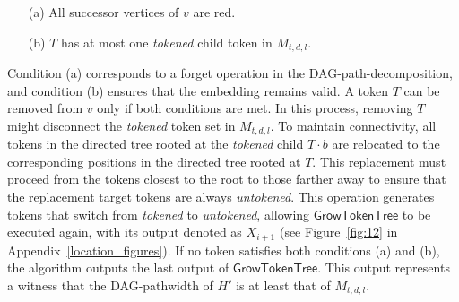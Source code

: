 \documentclass[runningheads]{llncs}
\theoremstyle{plain}
\theoremstyle{definition}
\begin{document}
\begin{enumerate}
    \item[(a)] All successor vertices of $v$ are red.
    \item[(b)] $T$ has at most one \textit{tokened} child token in $M_{t, d, l}$.
\end{enumerate}
%
Condition (a) corresponds to a forget operation in the DAG-path-decomposition, and condition (b) ensures that the embedding remains valid. A token $T$ can be removed from $v$ only if both conditions are met. In this process, removing $T$ might disconnect the \textit{tokened} token set in $M_{t, d, l}$. To maintain connectivity, all tokens in the directed tree rooted at the \textit{tokened} child $T \cdot b$ are relocated to the corresponding positions in the directed tree rooted at $T$. This replacement must proceed from the tokens closest to the root to those farther away to ensure that the replacement target tokens are always \textit{untokened}. This operation generates tokens that switch from \textit{tokened} to \textit{untokened}, allowing $\mathsf{GrowTokenTree}$ to be executed again, with its output denoted as $X_{i+1}$ (see Figure~\ref{fig:12} in Appendix~\ref{location_figures}). If no token satisfies both conditions (a) and (b), the algorithm outputs the last output of $\mathsf{GrowTokenTree}$. This output represents a witness that the DAG-pathwidth of $H'$ is at least that of $M_{t, d, l}$.
\end{document}
